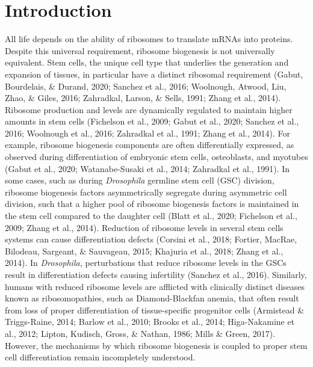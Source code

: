 \documentclass[12pt,oneside]{reedthesis}
\begin{document}
\hypertarget{introduction-2}{%
\section{Introduction}\label{introduction-2}}

All life depends on the ability of ribosomes to translate mRNAs into
proteins. Despite this universal requirement, ribosome biogenesis is not
universally equivalent. Stem cells, the unique cell type that underlies
the generation and expansion of tissues, in particular have a distinct
ribosomal requirement (Gabut, Bourdelais, \& Durand, 2020; Sanchez et al., 2016; Woolnough, Atwood, Liu, Zhao, \& Giles, 2016; Zahradkal, Larson, \& Sells, 1991; Zhang et al., 2014). Ribosome
production and levels are dynamically regulated to maintain higher
amounts in stem cells (Fichelson et al., 2009; Gabut et al., 2020; Sanchez et al., 2016; Woolnough et al., 2016; Zahradkal et al., 1991; Zhang et al., 2014). For
example, ribosome biogenesis components are often differentially
expressed, as observed during differentiation of embryonic stem cells,
osteoblasts, and myotubes (Gabut et al., 2020; Watanabe-Susaki et al., 2014; Zahradkal et al., 1991). In
some cases, such as during \emph{Drosophila} germline stem cell (GSC)
division, ribosome biogenesis factors asymmetrically segregate during
asymmetric cell division, such that a higher pool of ribosome biogenesis
factors is maintained in the stem cell compared to the daughter cell
(Blatt et al., 2020; Fichelson et al., 2009; Zhang et al., 2014). Reduction of ribosome levels in several stem cells
systems can cause differentiation defects
(Corsini et al., 2018; Fortier, MacRae, Bilodeau, Sargeant, \& Sauvageau, 2015; Khajuria et al., 2018; Zhang et al., 2014). In \emph{Drosophila,} perturbations that reduce ribosome
levels in the GSCs result in differentiation defects causing infertility
(Sanchez et al., 2016). Similarly, humans with reduced ribosome levels are
afflicted with clinically distinct diseases known as ribosomopathies,
such as Diamond-Blackfan anemia, that often result from loss of proper
differentiation of tissue-specific progenitor cells (Armistead \& Triggs-Raine, 2014; Barlow et al., 2010; Brooks et al., 2014; Higa-Nakamine et al., 2012; Lipton, Kudisch, Gross, \& Nathan, 1986; Mills \& Green, 2017). However, the
mechanisms by which ribosome biogenesis is coupled to proper stem cell
differentiation remain incompletely understood.
\end{document}
